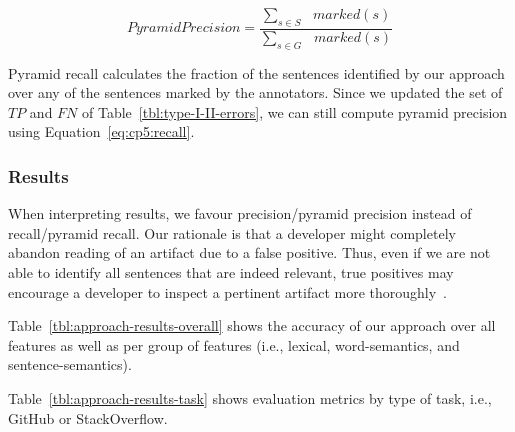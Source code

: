 \begin{equation}
\label{eq:cp5:pyramid-precision}    
    Pyramid Precision =  \frac{
        \sum_{s \in S} \text{ } marked(s)
    }{
        \sum_{s \in G} \text{ } marked(s)
    }
\end{equation}






\vspace{2mm}
Pyramid recall calculates the fraction of the sentences identified by our approach over 
any of the sentences marked by the annotators. Since we updated the set of $TP$ and $FN$ of Table~\ref{tbl:type-I-II-errors}, we can still compute pyramid precision using Equation~\ref{eq:cp5:recall}.




\subsubsection{Results}


When interpreting results, we favour precision/pyramid precision instead of recall/pyramid recall.
Our rationale is that a developer might completely abandon reading of an artifact due to a false positive.
Thus, even if we are not able to identify all sentences that are indeed relevant, true positives may encourage a developer to inspect a pertinent artifact more thoroughly~\cite{Singer1998, Brandt2009a}.




Table~\ref{tbl:approach-results-overall} shows the accuracy of our approach 
over all features as well as per group of features (i.e., lexical, word-semantics, and sentence-semantics).





Table~\ref{tbl:approach-results-task} shows evaluation metrics by type of task, i.e., GitHub or StackOverflow.





